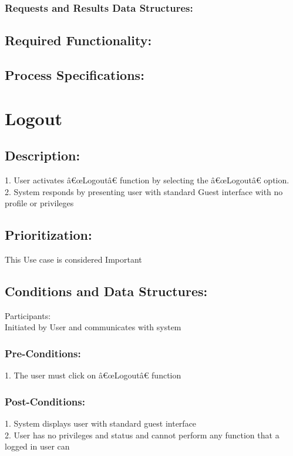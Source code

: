 \documentclass[a4paper,11pt]{article}
\begin{document}
\subsubsection*{Requests and Results Data Structures:}
\subsection{Required Functionality:} 
\subsection{Process Specifications:} 

\section{Logout}
\subsection*{Description:}
1.	User activates â€œLogoutâ€ function by selecting the â€œLogoutâ€ option.\\
2.	System responds by presenting user with standard Guest interface with no profile or privileges\\
\subsection{Prioritization:}
This Use case is considered Important\\ 
\subsection{Conditions and Data Structures:}
Participants:\\
Initiated by User and communicates with system\\
\subsubsection*{Pre-Conditions:}
1.	The user must click on â€œLogoutâ€ function\\
\subsubsection*{Post-Conditions:}
1.	System displays user with standard guest interface\\
2.	User has no privileges and status and cannot perform any function that a logged in user can\\
\end{document}

